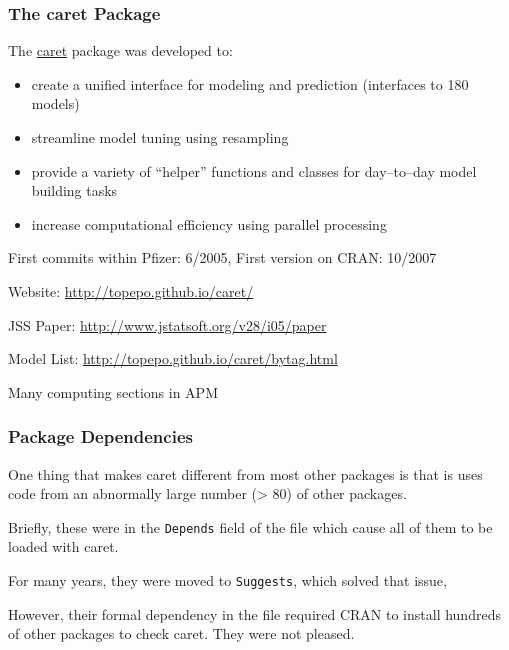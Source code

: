 \documentclass[12 pt]{beamer}\usepackage[]{graphicx}\usepackage[]{color}
\newcommand{\pkg}[1]{{\fontseries{b}\selectfont #1}}
\renewcommand{\pkg}[1]{{\color{darkgreen}\textsf{#1}}}
\begin{document}
  \begin{frame}[fragile]
\frametitle{The \pkg{caret} Package}

The \href{http://cran.r-project.org/web/packages/caret/index.html}{\pkg{caret}}  package was developed to:
  \begin{itemize}
\item create a unified interface for modeling and prediction
(interfaces to 180 models)
\item streamline model tuning using resampling
\item provide a variety of ``helper'' functions and classes for day--to--day model building tasks 
\item increase computational efficiency using parallel processing  
\end{itemize}

\vspace{.07in}

First commits within Pfizer: 6/2005, First version on CRAN: 10/2007

\vspace{.06in}

Website: \href{http://topepo.github.io/caret/}{http://topepo.github.io/caret/}

\vspace{.06in}

JSS Paper: \href{http://www.jstatsoft.org/v28/i05/paper}{http://www.jstatsoft.org/v28/i05/paper}

\vspace{.06in}

Model List: \href{http://topepo.github.io/caret/bytag.html}{http://topepo.github.io/caret/bytag.html}

\vspace{.06in}

Many computing sections in APM

\end{frame}

  
  \begin{frame}[fragile]
\frametitle{Package Dependencies}



One thing that makes \pkg{caret} different from most other packages is that is uses code from an abnormally large number (> 80) of other packages. 

\vspace{.15in}

Briefly, these were in the \texttt{Depends} field of the  file which cause all of them to be loaded with \pkg{caret}.

\vspace{.15in}

For many years, they were moved to \texttt{Suggests}, which solved that issue, 


\vspace{.15in}

However, their formal dependency in the  file required CRAN  to install hundreds of other packages to check  \pkg{caret}. They were not pleased. 

\end{frame}
\end{document}
